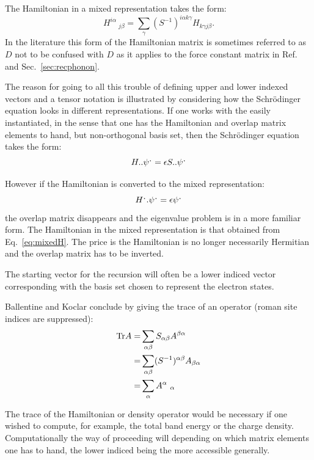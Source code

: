 The Hamiltonian in a mixed representation takes the form:
%
\begin{equation}
\label{eq:mixedH}
H^{i\alpha}\ _{j\beta} = \sum_{\gamma}(S^{-1})^{i\alpha k\gamma}H_{k\gamma j\beta}.
\end{equation}
%
In the literature this form of the Hamiltonian matrix is sometimes referred to as $D$ 
not to be confused with $D$ as it applies to the force constant matrix in Ref.~\cite{weeks73}
and Sec.~\ref{sec:recphonon}.

The reason for going to all this trouble of defining upper and lower
indexed vectors and a tensor notation is illustrated by considering how the Schr\"odinger
equation looks in different representations. If one works with
the easily instantiated, in the sense that one has the Hamiltonian and
overlap matrix elements to hand, but non-orthogonal basis set, then the Schr\"odinger
equation takes the form:
%
\begin{equation}
H..\psi^{\mbox{\large .}}=\epsilon S..\psi^{\mbox{\large .}}
\end{equation}
%

However if the Hamiltonian is converted to the mixed representation:
%
\begin{equation}
H^{\mbox{\large .}}.\psi^{\mbox{\large .}}=\epsilon\psi^{\mbox{\large .}}
\end{equation}
%
the overlap matrix disappears and the eigenvalue problem is in a 
more familiar form. The Hamiltonian in the mixed representation 
is that obtained from Eq.~\ref{eq:mixedH}. The price is the Hamiltonian
is no longer necessarily Hermitian and the overlap matrix has to be inverted.

The starting vector for the recursion will often be a lower indiced
vector corresponding with the basis set chosen to represent the electron
states.

Ballentine and Koclar conclude by giving the trace of an operator
(roman site indices are suppressed):
\begin{align}
{\rm Tr}A =& \sum_{\alpha\beta}S_{\alpha\beta}A^{\beta\alpha}\\
          =& \sum_{\alpha\beta}(S^{-1})^{\alpha\beta}A_{\beta\alpha} \\
          =& \sum_{\alpha}A^{\alpha}\ _{\alpha}
\end{align}

The trace of the Hamiltonian or density operator would be necessary 
if one wished to compute, for example, the total band energy 
or the charge density. Computationally the way of proceeding will
depending on which matrix elements one has to hand, 
the lower indiced being the more accessible generally. 

